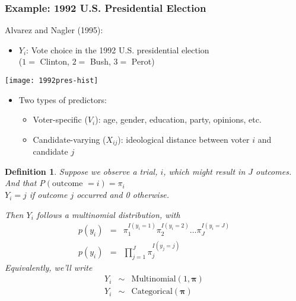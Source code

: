 \documentclass{beamer}
\newtheorem{defn}{Definition}
\begin{document}
\begin{frame}
\frametitle{Example: 1992 U.S. Presidential Election}
Alvarez and Nagler (1995):
\begin{itemize}
\item $Y_i$: Vote choice in the 1992 U.S. presidential election \\
($1 =$ Clinton, $2 = $ Bush, $3 = $ Perot)
\end{itemize}
\vspace{-\baselineskip}
\begin{center}
\texttt{[image: 1992pres-hist]}
\end{center}
\pause
\vspace{-2\baselineskip}
\begin{itemize}
\item Two types of predictors:
	\smallskip
	\begin{itemize}
	\addtolength{\itemsep}{.25\baselineskip}
	\item Voter-specific ($V_i$): age, gender, education, party, opinions, etc.
	\item Candidate-varying ($X_{ij}$): ideological distance between voter $i$ and candidate $j$
	\end{itemize}
\end{itemize}
\end{frame}





\begin{frame}

\begin{defn}
Suppose we observe a trial, $i$, which might result in $J$ outcomes.  \\
And that P$(\text{outcome } = i) = \pi_{i}$ \\
$Y_{i} = j$  if outcome $j$ occurred and 0 otherwise.

Then $Y_{i}$ follows a \alert{multinomial} distribution, with \\
\begin{eqnarray}
p(y_{i} ) & = & \pi_{1}^{I(y_{i}= 1) } \pi_{2}^{I(y_{i} = 2) } \hdots \pi_{J}^{I(y_{i} = J)} \nonumber \\
p(y_{i} ) & = & \prod_{j=1}^{J} \pi_{j}^{I(y_{j} = j ) } \nonumber
\end{eqnarray}
Equivalently, we'll write
\begin{eqnarray}
Y_{i}  & \sim & \text{Multinomial}(1, \boldsymbol{\pi}) \nonumber \\
Y_{i} & \sim & \text{Categorical}(\boldsymbol{\pi}) \nonumber
\end{eqnarray}
\end{defn}

\end{frame}
\end{document}
